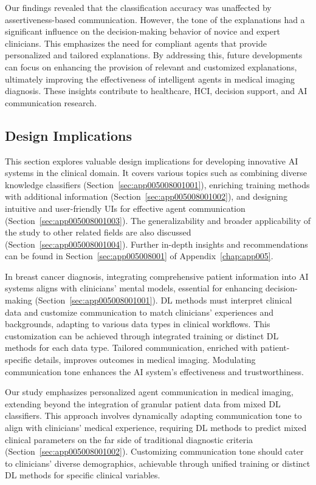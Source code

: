 Our findings revealed that the classification accuracy was unaffected by assertiveness-based communication.
However, the tone of the explanations had a significant influence on the decision-making behavior of novice and expert clinicians.
This emphasizes the need for compliant agents that provide personalized and tailored explanations.
By addressing this, future developments can focus on enhancing the provision of relevant and customized explanations, ultimately improving the effectiveness of intelligent agents in medical imaging diagnosis.
These insights contribute to healthcare, \ac{HCI}, decision support, and \ac{AI} communication research.

\subsection{Design Implications}
\label{sec:chap006007001}

This section explores valuable design implications for developing innovative \ac{AI} systems in the clinical domain.
It covers various topics such as combining diverse knowledge classifiers (Section~\ref{sec:app005008001001}), enriching training methods with additional information (Section~\ref{sec:app005008001002}), and designing intuitive and user-friendly \acp{UI} for effective agent communication (Section~\ref{sec:app005008001003}).
The generalizability and broader applicability of the study to other related fields are also discussed (Section~\ref{sec:app005008001004}).
Further in-depth insights and recommendations can be found in Section~\ref{sec:app005008001} of Appendix~\ref{chap:app005}.

\textcolor{revised}{In breast cancer diagnosis, integrating comprehensive patient information into \ac{AI} systems aligns with clinicians' mental models, essential for enhancing decision-making (Section~\ref{sec:app005008001001}).
\ac{DL} methods must interpret clinical data and customize communication to match clinicians' experiences and backgrounds, adapting to various data types in clinical workflows.
This customization can be achieved through integrated training or distinct \ac{DL} methods for each data type.
Tailored communication, enriched with patient-specific details, improves outcomes in medical imaging.
Modulating communication tone enhances the \ac{AI} system's effectiveness and trustworthiness.}

\textcolor{revised}{Our study emphasizes personalized agent communication in medical imaging, extending beyond the integration of granular patient data from mixed \ac{DL} classifiers.
This approach involves dynamically adapting communication tone to align with clinicians' medical experience, requiring \ac{DL} methods to predict mixed clinical parameters on the far side of traditional diagnostic criteria (Section~\ref{sec:app005008001002}).
Customizing communication tone should cater to clinicians' diverse demographics, achievable through unified training or distinct \ac{DL} methods for specific clinical variables.}

